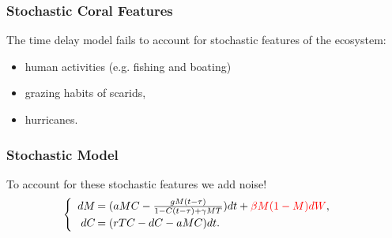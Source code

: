 \begin{frame}\frametitle{Stochastic Coral Features}
The time delay model fails to account for stochastic features of the ecosystem:
\begin{itemize}
\item human activities (e.g. fishing and boating)
\item grazing habits of scarids, 
\item hurricanes.
\end{itemize}
\end{frame}

\begin{frame}
\frametitle{Stochastic Model}
To account for these stochastic features we add noise!
$$\begin{cases}
\begin{array}{rl}
dM\hspace{-.8em}&=(aMC - \frac{gM(t-\tau)}{1-C(t-\tau)+\gamma M T})dt+{\color{red}\beta M(1-M)dW},\\
dC\hspace{-.8em}&=(rTC  - dC - aMC)dt.\\
\end{array}
\end{cases}$$
\end{frame}

